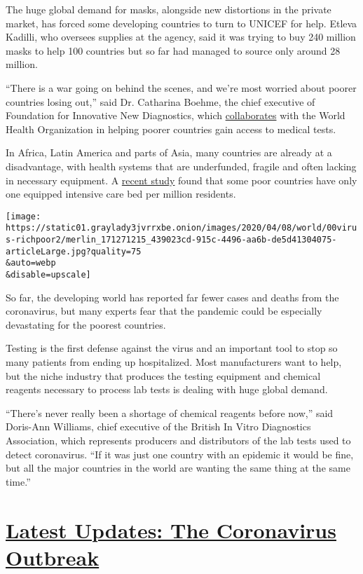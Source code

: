 The huge global demand for masks, alongside new distortions in the
private market, has forced some developing countries to turn to UNICEF
for help. Etleva Kadilli, who oversees supplies at the agency, said it
was trying to buy 240 million masks to help 100 countries but so far had
managed to source only around 28 million.

``There is a war going on behind the scenes, and we're most worried
about poorer countries losing out,'' said Dr. Catharina Boehme, the
chief executive of Foundation for Innovative New Diagnostics, which
\href{https://www.who.int/news-room/detail/10-02-2020-who-and-find-formalize-strategic-collaboration-to-drive-universal-access-to-essential-diagnostics}{collaborates}
with the World Health Organization in helping poorer countries gain
access to medical tests.

In Africa, Latin America and parts of Asia, many countries are already
at a disadvantage, with health systems that are underfunded, fragile and
often lacking in necessary equipment. A
\href{https://www.ncbi.nlm.nih.gov/pmc/articles/PMC4305307/}{recent
study} found that some poor countries have only one equipped intensive
care bed per million residents.

\texttt{[image: https://static01.graylady3jvrrxbe.onion/images/2020/04/08/world/00virus-richpoor2/merlin\_171271215\_439023cd-915c-4496-aa6b-de5d41304075-articleLarge.jpg?quality=75\\\&auto=webp\\\&disable=upscale]}

So far, the developing world has reported far fewer cases and deaths
from the coronavirus, but many experts fear that the pandemic could be
especially devastating for the poorest countries.

Testing is the first defense against the virus and an important tool to
stop so many patients from ending up hospitalized. Most manufacturers
want to help, but the niche industry that produces the testing equipment
and chemical reagents necessary to process lab tests is dealing with
huge global demand.

``There's never really been a shortage of chemical reagents before
now,'' said Doris-Ann Williams, chief executive of the British In Vitro
Diagnostics Association, which represents producers and distributors of
the lab tests used to detect coronavirus. ``If it was just one country
with an epidemic it would be fine, but all the major countries in the
world are wanting the same thing at the same time.''

\hypertarget{latest-updates-the-coronavirus-outbreak}{%
\section{\texorpdfstring{\href{https://www.nytimes3xbfgragh.onion/2020/09/08/world/covid-19-coronavirus.html?action=click\&pgtype=Article\&state=default\&region=MAIN_CONTENT_1\&context=storylines_live_updates}{Latest
Updates: The Coronavirus
Outbreak}}{Latest Updates: The Coronavirus Outbreak}}\label{latest-updates-the-coronavirus-outbreak}}

